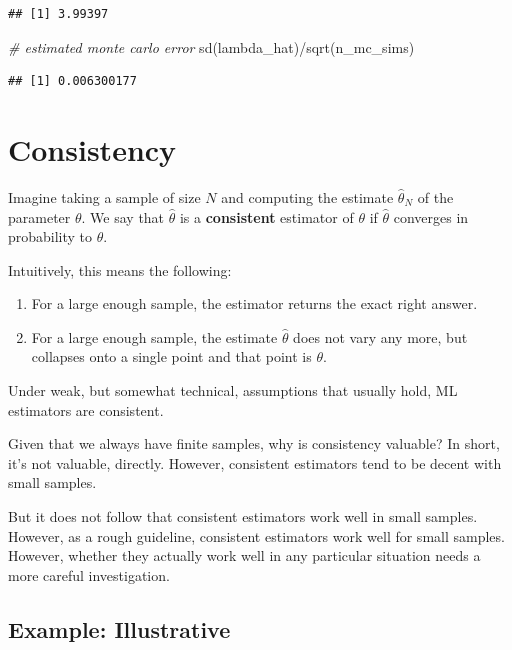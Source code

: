 \documentclass[
]{book}
\newenvironment{Shaded}{\begin{snugshade}}{\end{snugshade}}
\newcommand{\CommentTok}[1]{\textcolor[rgb]{0.56,0.35,0.01}{\textit{#1}}}
\newcommand{\FunctionTok}[1]{\textcolor[rgb]{0.00,0.00,0.00}{#1}}
\newcommand{\NormalTok}[1]{#1}
\newcommand{\SpecialCharTok}[1]{\textcolor[rgb]{0.00,0.00,0.00}{#1}}
\providecommand{\tightlist}{%
  \setlength{\itemsep}{0pt}\setlength{\parskip}{0pt}}
\begin{document}
\begin{verbatim}
## [1] 3.99397
\end{verbatim}

\begin{Shaded}
\begin{Highlighting}[]
\CommentTok{\# estimated monte carlo error}
\FunctionTok{sd}\NormalTok{(lambda\_hat)}\SpecialCharTok{/}\FunctionTok{sqrt}\NormalTok{(n\_mc\_sims)}
\end{Highlighting}
\end{Shaded}

\begin{verbatim}
## [1] 0.006300177
\end{verbatim}

\hypertarget{consistency}{%
\section{Consistency}\label{consistency}}

Imagine taking a sample of size \(N\) and computing the estimate
\(\hat{\theta}_N\) of the parameter \(\theta\). We say that
\(\hat{\theta}\) is a \textbf{consistent} estimator of \(\theta\) if
\(\hat{\theta}\) converges in probability to \(\theta\).

Intuitively, this means the following:

\begin{enumerate}
\def\labelenumi{\arabic{enumi}.}
\tightlist
\item
  For a large enough sample, the estimator returns the exact right
  answer.
\item
  For a large enough sample, the estimate \(\hat{\theta}\) does not vary
  any more, but collapses onto a single point and that point is
  \(\theta\).
\end{enumerate}

Under weak, but somewhat technical, assumptions that usually hold, ML
estimators are consistent.

Given that we always have finite samples, why is consistency valuable?
In short, it's not valuable, directly. However, consistent estimators
tend to be decent with small samples.

But it does not follow that consistent estimators work well in small
samples. However, as a rough guideline, consistent estimators work well
for small samples. However, whether they actually work well in any
particular situation needs a more careful investigation.

\hypertarget{example-illustrative}{%
\subsection{Example: Illustrative}\label{example-illustrative}}
\end{document}
